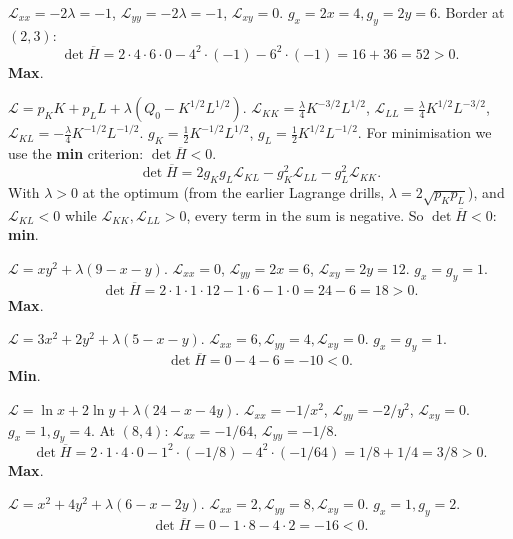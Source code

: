\begin{solutions}
        $\mathcal{L}_{xx} = -2 \lambda = -1$,
        $\mathcal{L}_{yy} = -2 \lambda = -1$, $\mathcal{L}_{xy} = 0$.
        $g_x = 2 x = 4, g_y = 2 y = 6$. Border at $(2, 3)$:
        \[\det \overline{H} = 2 \cdot 4 \cdot 6 \cdot 0
        - 4^2 \cdot (-1) - 6^2 \cdot (-1) = 16 + 36 = 52 > 0.\]
        \textbf{Max}. \checkmark
  \item $\mathcal{L} = p_K K + p_L L + \lambda(Q_0 - K^{1/2} L^{1/2})$.
        $\mathcal{L}_{KK} = \tfrac{\lambda}{4} K^{-3/2} L^{1/2}$,
        $\mathcal{L}_{LL} = \tfrac{\lambda}{4} K^{1/2} L^{-3/2}$,
        $\mathcal{L}_{KL} = -\tfrac{\lambda}{4} K^{-1/2} L^{-1/2}$.
        $g_K = \tfrac{1}{2} K^{-1/2} L^{1/2}$,
        $g_L = \tfrac{1}{2} K^{1/2} L^{-1/2}$. For minimisation we use
        the \textbf{min} criterion: $\det \overline{H} < 0$.
        \[\det \overline{H} = 2 g_K g_L \mathcal{L}_{KL}
        - g_K^2 \mathcal{L}_{LL} - g_L^2 \mathcal{L}_{KK}.\]
        With $\lambda > 0$ at the optimum (from the earlier Lagrange
        drills, $\lambda = 2 \sqrt{p_K p_L}$), and
        $\mathcal{L}_{KL} < 0$ while
        $\mathcal{L}_{KK}, \mathcal{L}_{LL} > 0$, every term in the sum
        is negative. So $\det \overline{H} < 0$: \textbf{min}.
        \checkmark
  \item $\mathcal{L} = x y^2 + \lambda(9 - x - y)$.
        $\mathcal{L}_{xx} = 0$, $\mathcal{L}_{yy} = 2 x = 6$,
        $\mathcal{L}_{xy} = 2 y = 12$. $g_x = g_y = 1$.
        \[\det \overline{H} = 2 \cdot 1 \cdot 1 \cdot 12 - 1 \cdot 6
        - 1 \cdot 0 = 24 - 6 = 18 > 0.\] \textbf{Max}. \checkmark
  \item $\mathcal{L} = 3 x^2 + 2 y^2 + \lambda(5 - x - y)$.
        $\mathcal{L}_{xx} = 6, \mathcal{L}_{yy} = 4,
        \mathcal{L}_{xy} = 0$. $g_x = g_y = 1$.
        \[\det \overline{H} = 0 - 4 - 6 = -10 < 0.\] \textbf{Min}.
        \checkmark
  \item $\mathcal{L} = \ln x + 2 \ln y + \lambda(24 - x - 4 y)$.
        $\mathcal{L}_{xx} = -1/x^2$, $\mathcal{L}_{yy} = -2/y^2$,
        $\mathcal{L}_{xy} = 0$. $g_x = 1, g_y = 4$. At $(8, 4)$:
        $\mathcal{L}_{xx} = -1/64$, $\mathcal{L}_{yy} = -1/8$.
        \[\det \overline{H} = 2 \cdot 1 \cdot 4 \cdot 0
        - 1^2 \cdot (-1/8) - 4^2 \cdot (-1/64) = 1/8 + 1/4
        = 3/8 > 0.\] \textbf{Max}. \checkmark
  \item $\mathcal{L} = x^2 + 4 y^2 + \lambda(6 - x - 2 y)$.
        $\mathcal{L}_{xx} = 2, \mathcal{L}_{yy} = 8,
        \mathcal{L}_{xy} = 0$. $g_x = 1, g_y = 2$.
        \[\det \overline{H} = 0 - 1 \cdot 8 - 4 \cdot 2 = -16 < 0.\]

\end{solutions}
